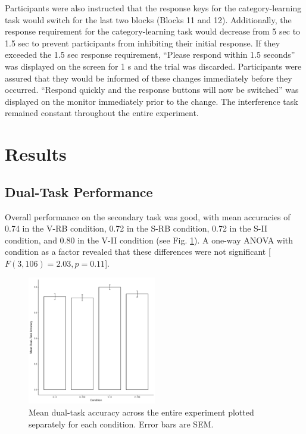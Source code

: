 \documentclass[apacite, draftfirst, jou]{apa6}
\begin{document}
Participants were also instructed that the response keys for the
category-learning task would switch for the last two blocks (Blocks 11 and 12).
Additionally, the response requirement for the category-learning task would
decrease from 5 sec to 1.5 sec to prevent participants from inhibiting their
initial response. If they exceeded the 1.5 sec response requirement, “Please
respond within 1.5 seconds” was displayed on the screen for 1 s and the trial
was discarded. Participants were assured that they would be informed of these
changes immediately before they occurred. “Respond quickly and the response
buttons will now be switched” was displayed on the monitor immediately prior to
the change. The interference task remained constant throughout the entire
experiment.

\section{Results}
\subsection{Dual-Task Performance}
Overall performance on the secondary task was good, with mean accuracies of 0.74
in the V-RB condition, 0.72 in the S-RB condition, 0.72 in the S-II condition,
and 0.80 in the V-II condition (see Fig. \ref{dt_accuracy}). A one-way ANOVA
with condition as a factor revealed that these differences were not significant
[$F(3, 106) = 2.03, p=0.11$].

\begin{figure}[h]
  \centering
  \includegraphics[width=0.5\textwidth]{../figs/dt_accuracy_bar.pdf}
  \caption{Mean dual-task accuracy across the entire experiment plotted
    separately for each condition. Error bars are SEM.}
  \label{dt_accuracy}
\end{figure}
\end{document}

